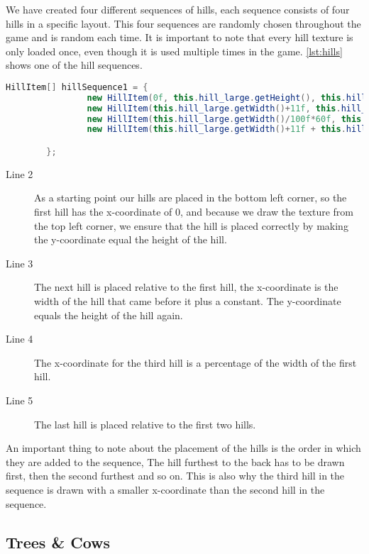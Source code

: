 We have created four different sequences of hills, each sequence consists of four hills in a specific layout. This four sequences are randomly chosen throughout the game and is random each time. It is important to note that every hill texture is only loaded once, even though it is used multiple times in the game. \autoref{lst:hills} shows one of the hill sequences.

\begin{lstlisting}[language=java,firstnumber=1,caption={Hill sequence},label=lst:hills]
        HillItem[] hillSequence1 = {
        		new HillItem(0f, this.hill_large.getHeight(), this.hill_large),
        		new HillItem(this.hill_large.getWidth()+11f, this.hill_medium.getHeight(), this.hill_medium),
        		new HillItem(this.hill_large.getWidth()/100f*60f, this.hill_small.getHeight(), this.hill_small),
        		new HillItem(this.hill_large.getWidth()+11f + this.hill_medium.getWidth()/100f*65f, this.hill_larger.getHeight(), this.hill_larger)

        }; 
\end{lstlisting}

\begin{description}
\item[Line 2] As a starting point our hills are placed in the bottom left corner, so the first hill has the x-coordinate of 0, and because we draw the texture from the top left corner, we ensure that the hill is placed correctly by making the y-coordinate equal the height of the hill. 
\item[Line 3] The next hill is placed relative to the first hill, the x-coordinate is the width of the hill that came before it plus a constant. The y-coordinate equals the height of the hill again.
\item[Line 4] The x-coordinate for the third hill is a percentage of the width of the first hill. 
\item[Line 5] The last hill is placed relative to the first two hills.
\end{description}

An important thing to note about the placement of the hills is the order in which they are added to the sequence, The hill furthest to the back has to be drawn first, then the second furthest and so on. This is also why the third hill in the sequence is drawn with a smaller x-coordinate than the second hill in the sequence.

\subsection{Trees \& Cows}

